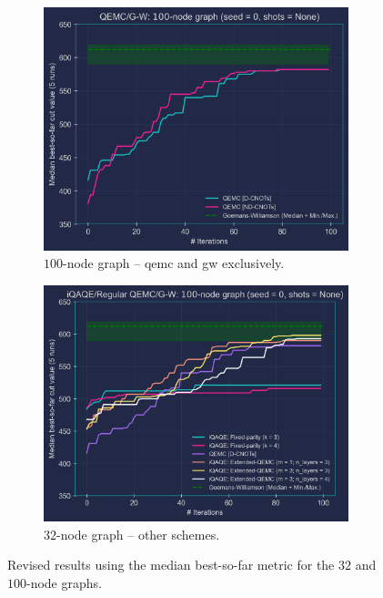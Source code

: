 \begin{figure}[hb!]
    \bigskip

    \begin{subfigure}[t]{0.495\textwidth}
		\includegraphics[width=0.975\textwidth, height=0.75\textwidth]{Figures/Appendix_A/100-node/100-node_Graph(QEMC&G-W)_Updated.png}
		\caption{$100$-node graph – \acrshort{qemc} and \acrshort{gw} exclusively.}
		\label{fig:C_BSF_1_100-node}
	\end{subfigure}
    \hfill
    \begin{subfigure}[t]{0.495\textwidth}
		\includegraphics[width=0.975\textwidth, height=0.75\textwidth]{Figures/Appendix_A/100-node/100-node_Graph_Updated.png}
		\caption{$32$-node graph – other schemes.}
		\label{fig:C_BSF_2_100-node}
	\end{subfigure}
    \caption{Revised results using the median best-so-far metric for the $32$ and $100$-node graphs.}
    \label{fig:Corrected_BSF_Results_8-node}
\end{figure}

